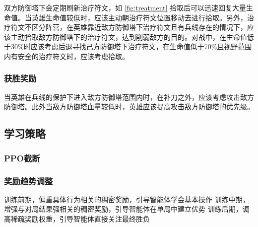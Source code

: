 双方防御塔下会定期刷新治疗符文，如 \cref{fig:treatment} 拾取后可以迅速回复大量生命值。当英雄生命值较低时，应该主动朝治疗符文位置移动去进行拾取。另外，治疗符文不区分阵营，在英雄靠近敌方防御塔下治疗符文且有兵线存在的情况下，应该主动拾取敌方防御塔下的治疗符文，达到削弱敌方的目的。对战中，在生命值低于30\%时应该考虑后退寻找己方防御塔下治疗符文，在生命值低于70\%且视野范围内有安全的治疗符文时，应该考虑拾取。

\subsubsection{获胜奖励}
当英雄在兵线的保护下进入敌方防御塔范围内时，在补刀之外，应该考虑攻击敌方防御塔。此外当敌方防御塔血量较低时，英雄应该提高攻击敌方防御塔的优先级。

\subsection{学习策略}

\subsubsection{PPO截断}
\subsubsection{奖励趋势调整}
训练前期，偏重具体行为相关的稠密奖励，引导智能体学会基本操作
训练中期，增强与对局结果强相关的稠密奖励，引导智能体在单局中建立优势
训练后期，调高稀疏奖励权重，引导智能体直接关注最终胜负